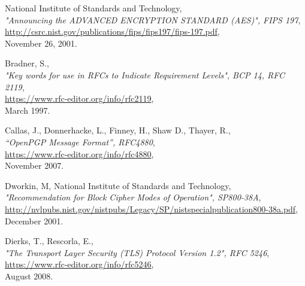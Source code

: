 \documentclass[10pt]{article}
\begin{document}
\begin{thebibliography}{XXXXXXX}


  National Institute of Standards and Technology,\\
  \emph{"Announcing the ADVANCED ENCRYPTION STANDARD (AES)", FIPS 197},\\
  \url{http://csrc.nist.gov/publications/fips/fips197/fips-197.pdf},\\
  November 26, 2001.

  Bradner, S.,\\
  \emph{"Key words for use in RFCs to Indicate Requirement Levels", BCP 14, RFC 2119},\\
  \url{https://www.rfc-editor.org/info/rfc2119},\\
  March 1997.

  Callas, J., Donnerhacke, L., Finney, H., Shaw D., Thayer, R.,\\
  \emph{``OpenPGP Message Format'', RFC4880},\\
  \url{https://www.rfc-editor.org/info/rfc4880},\\
  November 2007.


  Dworkin, M, National Institute of Standards and Technology,\\
  \emph{"Recommendation for Block Cipher Modes of Operation", SP800-38A},\\
  \url{http://nvlpubs.nist.gov/nistpubs/Legacy/SP/nistspecialpublication800-38a.pdf},\\
  December 2001.

  Dierks, T., Rescorla, E.,\\
  \emph{"The Transport Layer Security (TLS) Protocol Version 1.2", RFC 5246},\\
  \url{https://www.rfc-editor.org/info/rfc5246},\\
  August 2008.

\end{thebibliography}
\end{document}
